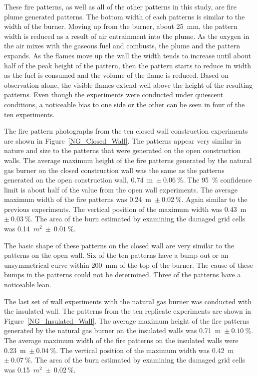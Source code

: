 \documentclass[twoside]{uocthesis}
\begin{document}
{These fire patterns, as well as all of the other patterns in this study, are fire plume generated patterns. The bottom width of each patterns is similar to the width of the burner. Moving up from the burner, about 25~mm, the pattern width is reduced as a result of air entrainment into the plume.  As the oxygen in the air mixes with the gaseous fuel and combusts, the plume and the pattern expands.  As the flames move up the wall the width tends to increase until about half of the peak height of the pattern, then the pattern starts to reduce in width as the fuel is consumed and the volume of the flame is reduced.  Based on observation alone, the visible flames extend well above the height of the resulting patterns.  Even though the experiments were conducted under quiescent conditions, a noticeable bias to one side or the other can be seen in four of the ten experiments.           

The fire pattern photographs from the ten closed wall construction experiments are shown in Figure~\ref{NG_Closed_Wall}. 
The patterns appear very similar in nature and size to the patterns that were generated on the open construction walls.  The average maximum height of the fire patterns generated by the natural gas burner on the closed construction wall was the same as the patterns generated on the open construction wall, 0.74~m~$\pm~0.06~\%$.  The 95~$\%$ confidence limit is about half of the value from the open wall experiments. The average maximum width of the fire patterns was 0.24~m~$\pm~0.02~\%$.  Again similar to the previous experiments. The vertical position of the maximum width was 0.43~m~$\pm~0.03~\%$. The area of the burn estimated by examining the damaged grid cells was 0.14~$m^2~\pm~0.01~\%$.  

The basic shape of these patterns on the closed wall are very similar to the patterns on the open wall.  Six of the ten patterns have a bump out or an unsymmetrical curve within 200~mm of the top of the burner.  The cause of these bumps in the patterns could not be determined. Three of the patterns have a noticeable lean.     
  
The last set of wall experiments with the natural gas burner was conducted with the insulated wall.  The patterns from the ten replicate experiments are shown in Figure~\ref{NG_Insulated_Wall}.  The average maximum height of the fire patterns generated by the natural gas burner on the insulated walls was 0.71~m~$\pm~0.10~\%$.  The average maximum width of the fire patterns on the insulated walls were 0.23~m~$\pm~0.04~\%$.  The vertical position of the maximum width was 0.42~m~$\pm~0.07~\%$. The area of the burn estimated by examining the damaged grid cells was 0.15~$m^2~\pm~0.02~\%$.  

}
\end{document}
